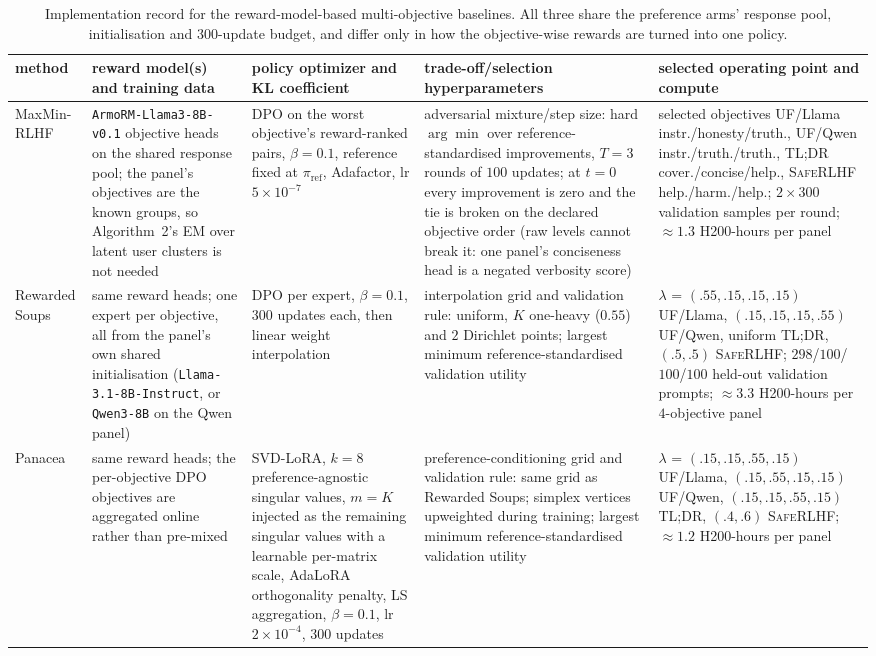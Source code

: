 \documentclass{article}
\theoremstyle{remark}
\theoremstyle{plain}
\newcommand{\piref}{\pi_{\mathrm{ref}}}
\begin{document}
\begin{table}[t]
\centering\scriptsize
\setlength{\tabcolsep}{3.0pt}
\caption{Implementation record for the reward-model-based multi-objective baselines. All three share the preference arms' response pool, initialisation and $300$-update budget, and differ only in how the objective-wise rewards are turned into one policy.}
\label{tab:rm-baseline-protocol}
\begin{tabular}{p{2.3cm}p{2.8cm}p{2.5cm}p{2.5cm}p{2.6cm}}
\toprule
method & reward model(s) and training data & policy optimizer and KL coefficient & trade-off/selection hyperparameters & selected operating point and compute\\
\midrule
MaxMin-RLHF & \texttt{ArmoRM-\allowbreak Llama3-\allowbreak 8B-\allowbreak v0.1} objective heads on the shared response pool; the panel's objectives are the known groups, so Algorithm~2's EM over latent user clusters is not needed & DPO on the worst objective's reward-ranked pairs, $\beta=0.1$, reference fixed at $\piref$, Adafactor, lr $5\times10^{-7}$ & adversarial mixture/step size: hard $\arg\min$ over reference-standardised improvements, $T=3$ rounds of $100$ updates; at $t=0$ every improvement is zero and the tie is broken on the declared objective order (raw levels cannot break it: one panel's conciseness head is a negated verbosity score) & selected objectives \textsc{UF}/Llama instr./honesty/truth., \textsc{UF}/Qwen instr./truth./truth., \textsc{TL;DR} cover./concise/help., \textsc{SafeRLHF} help./harm./help.; $2\times300$ validation samples per round; ${\approx}1.3$ H200-hours per panel\\
Rewarded Soups & same reward heads; one expert per objective, all from the panel's own shared initialisation (\texttt{Llama-3.1-\allowbreak 8B-\allowbreak Instruct}, or \texttt{Qwen3-8B} on the Qwen panel) & DPO per expert, $\beta=0.1$, $300$ updates each, then linear weight interpolation & interpolation grid and validation rule: uniform, $K$ one-heavy ($0.55$) and $2$ Dirichlet points; largest minimum reference-standardised validation utility & $\lambda$ = $(.55,.15,.15,.15)$ \textsc{UF}/Llama, $(.15,.15,.15,.55)$ \textsc{UF}/Qwen, uniform \textsc{TL;DR}, $(.5,.5)$ \textsc{SafeRLHF}; $298$/$100$/$100$/$100$ held-out validation prompts; ${\approx}3.3$ H200-hours per $4$-objective panel\\
Panacea & same reward heads; the per-objective DPO objectives are aggregated online rather than pre-mixed & SVD-LoRA, $k=8$ preference-agnostic singular values, $m=K$ injected as the remaining singular values with a learnable per-matrix scale, AdaLoRA orthogonality penalty, LS aggregation, $\beta=0.1$, lr $2\times10^{-4}$, $300$ updates & preference-conditioning grid and validation rule: same grid as Rewarded Soups; simplex vertices upweighted during training; largest minimum reference-standardised validation utility & $\lambda$ = $(.15,.15,.55,.15)$ \textsc{UF}/Llama, $(.15,.55,.15,.15)$ \textsc{UF}/Qwen, $(.15,.15,.55,.15)$ \textsc{TL;DR}, $(.4,.6)$ \textsc{SafeRLHF}; ${\approx}1.2$ H200-hours per panel\\
\bottomrule
\end{tabular}
\end{table}
\end{document}
